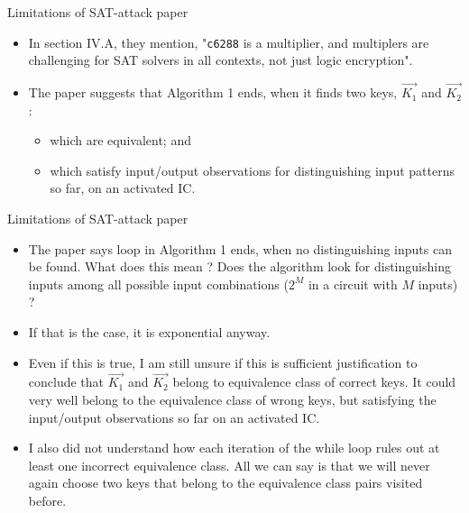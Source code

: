 \begin{frame}{Limitations of SAT-attack paper}
	\begin{itemize}
		\item In section IV.A, they mention, "\texttt{c6288} is a multiplier, and multiplers are challenging for SAT solvers in all contexts, not just logic encryption".
		\item The paper suggests that Algorithm 1 ends, when it finds two keys, $\vec{K_1}$ and $\vec{K_2}$:
			\begin{itemize}
				\item which are equivalent; and
				\item which satisfy input/output observations for distinguishing input patterns so far, on an activated IC. 
			\end{itemize}
	\end{itemize}
\end{frame}

\begin{frame}{Limitations of SAT-attack paper}
\begin{itemize}
		\item The paper says loop in Algorithm 1 ends, when no distinguishing inputs can be found. What does this mean ? Does the algorithm look for distinguishing inputs among all possible input combinations ($2^M$ in a circuit with $M$ inputs) ? 
		\item If that is the case, it is exponential anyway. 
		\item Even if this is true, I am still unsure if this is sufficient justification to conclude that $\vec{K_1}$ and $\vec{K_2}$ belong to equivalence class of correct keys. It could very well belong to the equivalence class of wrong keys, but satisfying the input/output observations so far on an activated IC. 
		\item I also did not understand how each iteration of the while loop rules out at least one incorrect equivalence class. All we can say is that we will never again choose two keys that belong to the equivalence class pairs visited before. 
	\end{itemize}
\end{frame}

